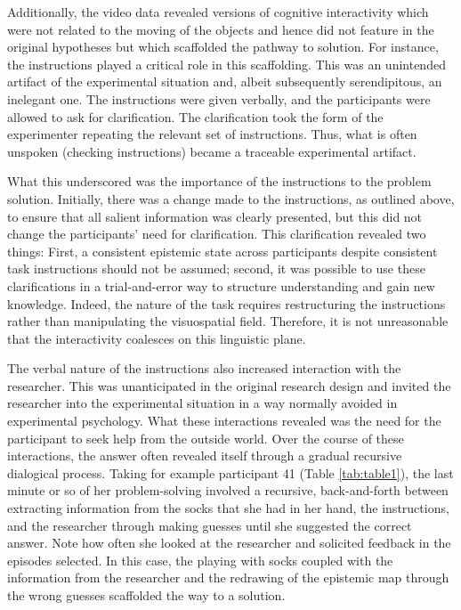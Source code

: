 \documentclass[twocolumn, serif, empirical, authordate]{jote-article}
\begin{document}
Additionally, the video data revealed versions of cognitive interactivity which were not related to the moving of the objects and hence did not feature in the original hypotheses but which scaffolded the pathway to solution. For instance, the instructions played a critical role in this scaffolding. This was an unintended artifact of the experimental situation and, albeit subsequently serendipitous, an inelegant one. The instructions were given verbally, and the participants were allowed to ask for clarification. The clarification took the form of the experimenter repeating the relevant set of instructions. Thus, what is often unspoken (checking instructions) became a traceable experimental artifact. 

What this underscored was the importance of the instructions to the problem solution. Initially, there was a change made to the instructions, as outlined above, to ensure that all salient information was clearly presented, but this did not change the participants' need for clarification. This clarification revealed two things: First, a consistent epistemic state across participants despite consistent task instructions should not be assumed; second, it was possible to use these clarifications in a trial-and-error way to structure understanding and gain new knowledge. Indeed, the nature of the task requires restructuring the instructions rather than manipulating the visuospatial field. Therefore, it is not unreasonable that the interactivity coalesces on this linguistic plane. 

The verbal nature of the instructions also increased interaction with the researcher. This was unanticipated in the original research design and invited the researcher into the experimental situation in a way normally avoided in experimental psychology. What these interactions revealed was the need for the participant to seek help from the outside world. Over the course of these interactions, the answer often revealed itself through a gradual recursive dialogical process. Taking for example participant 41 (Table \ref{tab:table1}), the last minute or so of her problem-solving involved a recursive, back-and-forth between extracting information from the socks that she had in her hand, the instructions, and the researcher through making guesses until she suggested the correct answer. Note how often she looked at the researcher and solicited feedback in the episodes selected. In this case, the playing with socks coupled with the information from the researcher and the redrawing of the epistemic map through the wrong guesses scaffolded the way to a solution. 
\end{document}
